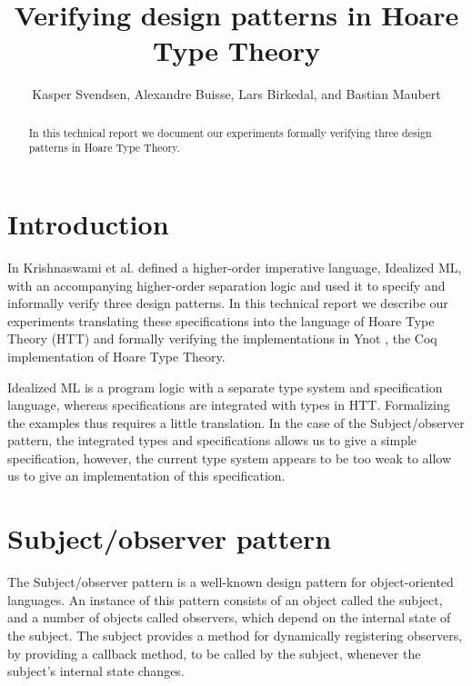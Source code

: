 \documentclass[a4paper,english]{article}
\title{Verifying design patterns in Hoare Type Theory}
\author{Kasper Svendsen, Alexandre Buisse, Lars Birkedal, and Bastian Maubert}
\begin{document}
 
\maketitle

\begin{abstract}
In this technical report we document our experiments formally verifying three
design patterns in Hoare Type Theory.
\end{abstract}

\section{Introduction}

In \cite{patterns, subobj} Krishnaswami et al. defined a higher-order imperative
language, Idealized ML, with an accompanying higher-order separation logic and
used it to specify and informally verify three design patterns. In this
technical report we describe our experiments translating these specifications
into the language of Hoare Type Theory (HTT) and formally verifying the
implementations in Ynot \cite{ynot-conf}, the Coq implementation of Hoare
Type Theory.

Idealized ML is a program logic with a separate type system and specification
language, whereas specifications are integrated with types in HTT. Formalizing
the examples thus requires a little translation. In the case of the
Subject/observer pattern, the integrated types and specifications allows us to
give a simple specification, however, the current type system appears to be
too weak to allow us to give an implementation of this specification. 

\section{Subject/observer pattern}

The Subject/observer pattern is a well-known design pattern for object-oriented
languages. An instance of this pattern consists of an object called the
subject, and a number of objects called observers, which depend on the internal
state of the subject. The subject provides a method for dynamically registering
observers, by providing a callback method, to be called by the subject,
whenever the subject's internal state changes.
\end{document}
